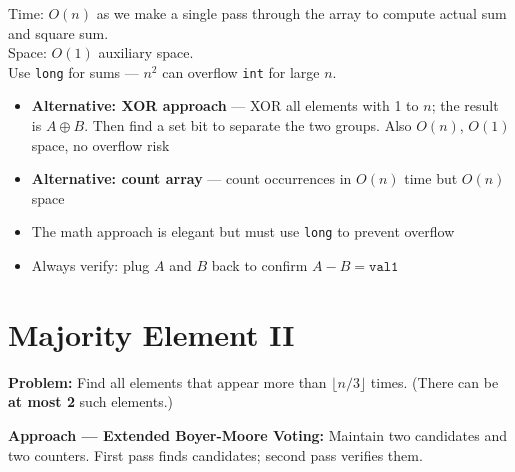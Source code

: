 \documentclass[12pt,a4paper,oneside]{book}
\begin{document}
\begin{complexity}
Time: $O(n)$ as we make a single pass through the array to compute actual sum and square sum.\\
Space: $O(1)$ auxiliary space.\\
Use \texttt{long} for sums --- $n^2$ can overflow \texttt{int} for large $n$.
\end{complexity}

\begin{interviewcorner}
\begin{itemize}
  \item \textbf{Alternative: XOR approach} --- XOR all elements with 1 to $n$; the result is $A \oplus B$. Then find a set bit to separate the two groups. Also $O(n)$, $O(1)$ space, no overflow risk
  \item \textbf{Alternative: count array} --- count occurrences in $O(n)$ time but $O(n)$ space
  \item The math approach is elegant but must use \texttt{long} to prevent overflow
  \item Always verify: plug $A$ and $B$ back to confirm $A - B = \texttt{val1}$
\end{itemize}
\end{interviewcorner}

\section{Majority Element II}

\textbf{Problem:} Find all elements that appear more than $\lfloor n/3 \rfloor$ times. (There can be \textbf{at most 2} such elements.)

\textbf{Approach --- Extended Boyer-Moore Voting:} Maintain two candidates and two counters. First pass finds candidates; second pass verifies them.
\end{document}
